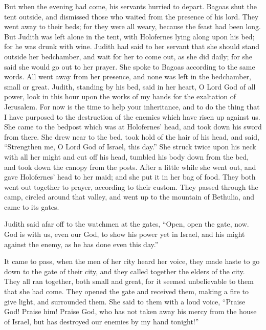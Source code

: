  But when the evening had come, his servants hurried to
depart. Bagoas shut the tent outside, and dismissed those who waited
from the presence of his lord. They went away to their beds; for they
were all weary, because the feast had been long.  But Judith
was left alone in the tent, with Holofernes lying along upon his bed;
for he was drunk with wine.  Judith had said to her servant
that she should stand outside her bedchamber, and wait for her to come
out, as she did daily; for she said she would go out to her prayer. She
spoke to Bagoas according to the same words.  All went away
from her presence, and none was left in the bedchamber, small or great.
Judith, standing by his bed, said in her heart, O Lord God of all power,
look in this hour upon the works of my hands for the exaltation of
Jerusalem.  For now is the time to help your inheritance,
and to do the thing that I have purposed to the destruction of the
enemies which have risen up against us.  She came to the
bedpost which was at Holofernes' head, and took down his sword from
there.  She drew near to the bed, took hold of the hair of
his head, and said, ``Strengthen me, O Lord God of Israel, this day.''
 She struck twice upon his neck with all her might and cut
off his head,  tumbled his body down from the bed, and took
down the canopy from the posts. After a little while she went out, and
gave Holofernes' head to her maid;  and she put it in her
bag of food. They both went out together to prayer, according to their
custom. They passed through the camp, circled around that valley, and
went up to the mountain of Bethulia, and came to its gates.

 Judith said afar off to the watchmen at the gates, ``Open,
open the gate, now. God is with us, even our God, to show his power yet
in Israel, and his might against the enemy, as he has done even this
day.''

 It came to pass, when the men of her city heard her voice,
they made haste to go down to the gate of their city, and they called
together the elders of the city.  They all ran together,
both small and great, for it seemed unbelievable to them that she had
come. They opened the gate and received them, making a fire to give
light, and surrounded them.  She said to them with a loud
voice, ``Praise God! Praise him! Praise God, who has not taken away his
mercy from the house of Israel, but has destroyed our enemies by my hand
tonight!''

